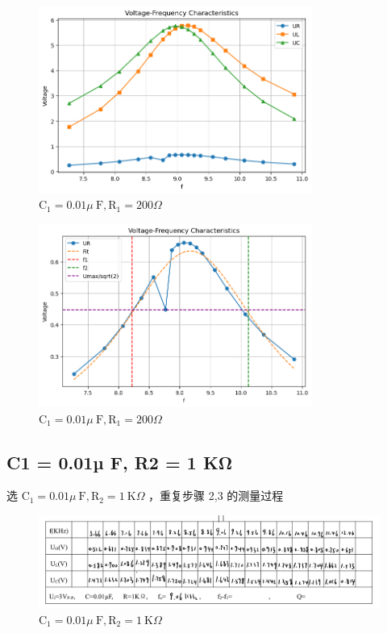 \documentclass{article}
\begin{document}
\begin{figure}[H]
    \centering
    \includegraphics[width=0.8\textwidth]{output.png}
    \caption{ $\mathrm{C}_1=0.01 \mu \mathrm{~F}, \mathrm{R}_1=200 \Omega$}
    \label{fig:diff_circuit}
\end{figure}
\begin{figure}[H]
    \centering
    \includegraphics[width=0.8\textwidth]{output3.png}
    \caption{ $\mathrm{C}_1=0.01 \mu \mathrm{~F}, \mathrm{R}_1=200 \Omega$}
    \label{fig:diff_circuit}
\end{figure}

\subsection{C1 = 0.01µ F, R2 = 1 KΩ}
选 $\mathrm{C}_1=0.01 \mu \mathrm{~F}, \mathrm{R}_2=1 \mathrm{~K} \Omega$ ，重复步骤 2,3 的测量过程

\begin{figure}[H]
    \centering
    \includegraphics[width=\textwidth]{img5.png}
    \caption{  $\mathrm{C}_1=0.01 \mu \mathrm{~F}, \mathrm{R}_2=1 \mathrm{~K} \Omega$}
    \label{fig:diff_circuit}
\end{figure}
\end{document}
